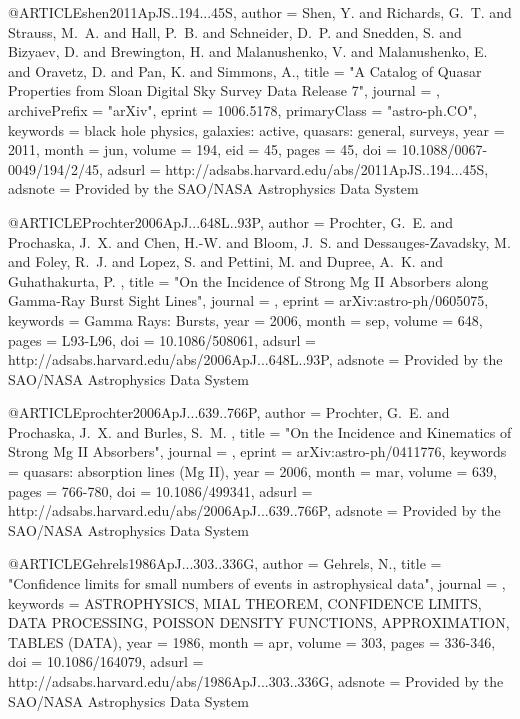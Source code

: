 \documentclass[twocolumn]{aastex62}
\begin{document}
@ARTICLE{shen2011ApJS..194...45S,
   author = {{Shen}, Y. and {Richards}, G.~T. and {Strauss}, M.~A. and {Hall}, P.~B. and 
	{Schneider}, D.~P. and {Snedden}, S. and {Bizyaev}, D. and {Brewington}, H. and 
	{Malanushenko}, V. and {Malanushenko}, E. and {Oravetz}, D. and 
	{Pan}, K. and {Simmons}, A.},
    title = "{A Catalog of Quasar Properties from Sloan Digital Sky Survey Data Release 7}",
  journal = {\apjs},
archivePrefix = "arXiv",
   eprint = {1006.5178},
 primaryClass = "astro-ph.CO",
 keywords = {black hole physics, galaxies: active, quasars: general, surveys},
     year = 2011,
    month = jun,
   volume = 194,
      eid = {45},
    pages = {45},
      doi = {10.1088/0067-0049/194/2/45},
   adsurl = {http://adsabs.harvard.edu/abs/2011ApJS..194...45S},
  adsnote = {Provided by the SAO/NASA Astrophysics Data System}
}

@ARTICLE{Prochter2006ApJ...648L..93P,
   author = {{Prochter}, G.~E. and {Prochaska}, J.~X. and {Chen}, H.-W. and 
	{Bloom}, J.~S. and {Dessauges-Zavadsky}, M. and {Foley}, R.~J. and 
	{Lopez}, S. and {Pettini}, M. and {Dupree}, A.~K. and {Guhathakurta}, P.
	},
    title = "{On the Incidence of Strong Mg II Absorbers along Gamma-Ray Burst Sight Lines}",
  journal = {\apjl},
   eprint = {arXiv:astro-ph/0605075},
 keywords = {Gamma Rays: Bursts},
     year = 2006,
    month = sep,
   volume = 648,
    pages = {L93-L96},
      doi = {10.1086/508061},
   adsurl = {http://adsabs.harvard.edu/abs/2006ApJ...648L..93P},
  adsnote = {Provided by the SAO/NASA Astrophysics Data System}
}


@ARTICLE{prochter2006ApJ...639..766P,
   author = {{Prochter}, G.~E. and {Prochaska}, J.~X. and {Burles}, S.~M.
	},
    title = "{On the Incidence and Kinematics of Strong Mg II Absorbers}",
  journal = {\apj},
   eprint = {arXiv:astro-ph/0411776},
 keywords = {quasars: absorption lines (Mg II)},
     year = 2006,
    month = mar,
   volume = 639,
    pages = {766-780},
      doi = {10.1086/499341},
   adsurl = {http://adsabs.harvard.edu/abs/2006ApJ...639..766P},
  adsnote = {Provided by the SAO/NASA Astrophysics Data System}
}

@ARTICLE{Gehrels1986ApJ...303..336G,
   author = {{Gehrels}, N.},
    title = "{Confidence limits for small numbers of events in astrophysical data}",
  journal = {\apj},
 keywords = {ASTROPHYSICS, MIAL THEOREM, CONFIDENCE LIMITS, DATA PROCESSING, POISSON DENSITY FUNCTIONS, APPROXIMATION, TABLES (DATA)},
     year = 1986,
    month = apr,
   volume = 303,
    pages = {336-346},
      doi = {10.1086/164079},
   adsurl = {http://adsabs.harvard.edu/abs/1986ApJ...303..336G},
  adsnote = {Provided by the SAO/NASA Astrophysics Data System}
}
\end{document}
